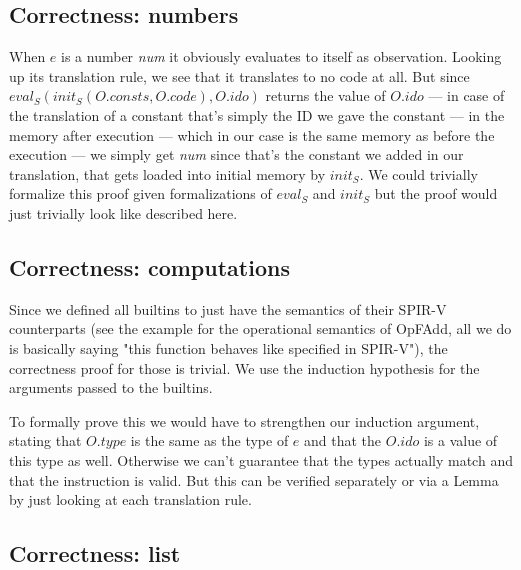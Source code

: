 \documentclass[letterpaper,12pt]{article}
\begin{document}
\subsection{Correctness: numbers}

When $e$ is a number \textit{num} it obviously evaluates to itself
as observation. Looking up its translation rule, we see that it translates
to no code at all. But since $eval_S(init_S(O.consts, O.code), O.ido)$
returns the value of $O.ido$ --- in case of the translation of a constant that's simply
the ID we gave the constant --- in the memory after execution --- which
in our case is the same memory as before the execution --- we simply
get \textit{num} since that's the constant we added in our translation,
that gets loaded into initial memory by $init_S$.
We could trivially formalize this proof given formalizations of 
$eval_S$ and $init_S$ but the proof would just trivially look like
described here.

\subsection{Correctness: computations}

Since we defined all builtins to just have the semantics of their
SPIR-V counterparts (see the example for the operational semantics of OpFAdd,
all we do is basically saying "this function behaves like specified in
SPIR-V"), the correctness proof for those is trivial. We use the
induction hypothesis for the arguments passed to the builtins.

To formally prove this we would have to strengthen our induction
argument, stating that $O.type$ is the same as the type of $e$ and that
the $O.ido$ is a value of this type as well. Otherwise we can't guarantee 
that the types actually match and that the instruction is valid.
But this can be verified separately or via a Lemma by just looking at
each translation rule.

% 

\subsection{Correctness: list}
\end{document}
